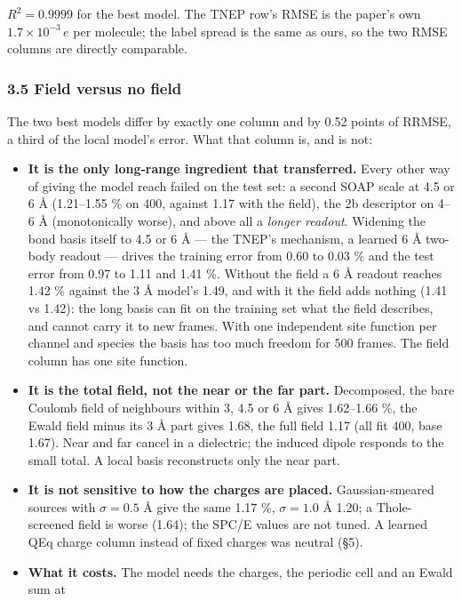 \documentclass[
  10pt,
]{article}
\providecommand{\tightlist}{%
  \setlength{\itemsep}{0pt}\setlength{\parskip}{0pt}}
\providecommand{\tightlist}{\setlength{\itemsep}{0pt}\setlength{\parskip}{0pt}}
\begin{document}
\(R^2=0.9999\) for the best model. The TNEP row's RMSE is the paper's own \(1.7\times10^{-3}\,e\)
per molecule; the label spread is the same as ours, so the two RMSE columns are directly comparable.

\subsubsection{3.5 Field versus no field}\label{field-versus-no-field}

The two best models differ by exactly one column and by 0.52 points of RRMSE, a third of the local
model's error. What that column is, and is not:

\begin{itemize}
\tightlist
\item
  \textbf{It is the only long-range ingredient that transferred.} Every other way of giving the
  model reach failed on the test set: a second SOAP scale at 4.5 or 6 \AA{} (1.21--1.55 \% on 400,
  against 1.17 with the field), the 2b descriptor on 4--6 \AA{} (monotonically worse), and above all
  a \emph{longer readout}. Widening the bond basis itself to 4.5 or 6 \AA{} --- the TNEP's
  mechanism, a learned 6 \AA{} two-body readout --- drives the training error from 0.60 to 0.03 \%
  and the test error from 0.97 to 1.11 and 1.41 \%. Without the field a 6 \AA{} readout reaches 1.42
  \% against the 3 \AA{} model's 1.49, and with it the field adds nothing (1.41 vs 1.42): the long
  basis can fit on the training set what the field describes, and cannot carry it to new frames.
  With one independent site function per channel and species the basis has too much freedom for 500
  frames. The field column has one site function.
\item
  \textbf{It is the total field, not the near or the far part.} Decomposed, the bare Coulomb field
  of neighbours within 3, 4.5 or 6 \AA{} gives 1.62--1.66 \%, the Ewald field minus its 3 \AA{} part
  gives 1.68, the full field 1.17 (all fit 400, base 1.67). Near and far cancel in a dielectric; the
  induced dipole responds to the small total. A local basis reconstructs only the near part.
\item
  \textbf{It is not sensitive to how the charges are placed.} Gaussian-smeared sources with
  \(\sigma=0.5\) \AA{} give the same 1.17 \%, \(\sigma=1.0\) \AA{} 1.20; a Thole-screened field is
  worse (1.64); the SPC/E values are not tuned. A learned QEq charge column instead of fixed charges
  was neutral (§5).
\item
  \textbf{What it costs.} The model needs the charges, the periodic cell and an Ewald sum at

\end{itemize}
\end{document}
